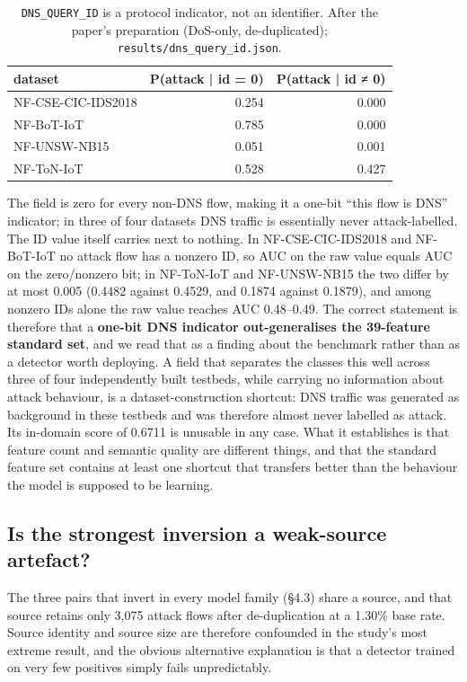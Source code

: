 \documentclass[journal]{IEEEtran}
\begin{document}
\begin{table}[htbp]\centering\scriptsize
\caption{\texttt{DNS\_QUERY\_ID} is a protocol indicator, not an identifier. After the paper's preparation (DoS-only, de-duplicated); \texttt{results/dns\_query\_id.json}.}
\begin{tabular}{lrr}
\toprule
dataset & P(attack | id = 0) & P(attack | id ≠ 0) \\
\midrule
NF-CSE-CIC-IDS2018 & 0.254 & 0.000 \\
NF-BoT-IoT & 0.785 & 0.000 \\
NF-UNSW-NB15 & 0.051 & 0.001 \\
NF-ToN-IoT & 0.528 & 0.427 \\
\bottomrule
\end{tabular}
\end{table}

The field is zero for every non-DNS flow, making it a one-bit ``this flow is DNS'' indicator; in three of four datasets DNS traffic is essentially never attack-labelled. The ID value itself carries next to nothing. In NF-CSE-CIC-IDS2018 and NF-BoT-IoT no attack flow has a nonzero ID, so AUC on the raw value equals AUC on the zero/nonzero bit; in NF-ToN-IoT and NF-UNSW-NB15 the two differ by at most 0.005 (0.4482 against 0.4529, and 0.1874 against 0.1879), and among nonzero IDs alone the raw value reaches AUC 0.48--0.49. The correct statement is therefore that a \textbf{one-bit DNS indicator out-generalises the 39-feature standard set}, and we read that as a finding about the benchmark rather than as a detector worth deploying. A field that separates the classes this well across three of four independently built testbeds, while carrying no information about attack behaviour, is a dataset-construction shortcut: DNS traffic was generated as background in these testbeds and was therefore almost never labelled as attack. Its in-domain score of 0.6711 is unusable in any case. What it establishes is that feature count and semantic quality are different things, and that the standard feature set contains at least one shortcut that transfers better than the behaviour the model is supposed to be learning.

\subsection{Is the strongest inversion a weak-source artefact?}

The three pairs that invert in every model family (§4.3) share a source, and that source retains only 3,075 attack flows after de-duplication at a 1.30\% base rate. Source identity and source size are therefore confounded in the study's most extreme result, and the obvious alternative explanation is that a detector trained on very few positives simply fails unpredictably.
\end{document}
